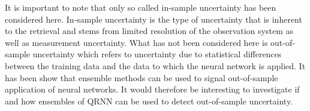 \documentclass[journal abbreviation, manuscript]{copernicus}
\begin{document}
It is important to note that only so called in-sample uncertainty has been
considered here. In-sample uncertainty is the type of uncertainty that is
inherent to the retrieval and stems from limited resolution of the observation
system as well as measurement uncertainty. What has not been considered here is
out-of-sample uncertainty which refers to uncertainty due to statistical
differences between the training data and the data to which the neural network
is applied. It has been show that ensemble methods can be used to signal
out-of-sample application of neural networks. It would therefore be interesting
to investigate if and how ensembles of QRNN can be used to detect out-of-sample
uncertainty.












\appendix
\section{}    %

\subsection{}     %


\noappendix       %

\end{document}
